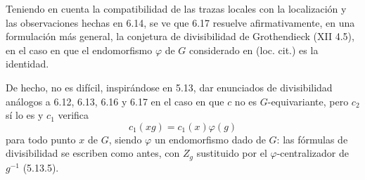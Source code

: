 Teniendo en cuenta la compatibilidad de las trazas locales con la localización y las observaciones hechas en 6.14, se ve que 6.17 resuelve afirmativamente, en una formulación más general, la conjetura de divisibilidad de Grothendieck (XII 4.5), en el caso en que el endomorfismo $\varphi$ de $G$ considerado en (loc. cit.) es la identidad.

De hecho, no es difícil, inspirándose en 5.13, dar enunciados de divisibilidad análogos a 6.12, 6.13, 6.16 y 6.17 en el caso en que $c$ no es $G$-equivariante, pero $c_2$ sí lo es y $c_1$ verifica
\[
c_1(xg)=c_1(x)\varphi(g)
\]
para todo punto $x$ de $G$, siendo $\varphi$ un endomorfismo dado de $G$: las fórmulas de divisibilidad se escriben como antes, con $Z_g$ sustituido por el $\varphi$-centralizador de $g^{-1}$ (5.13.5).
